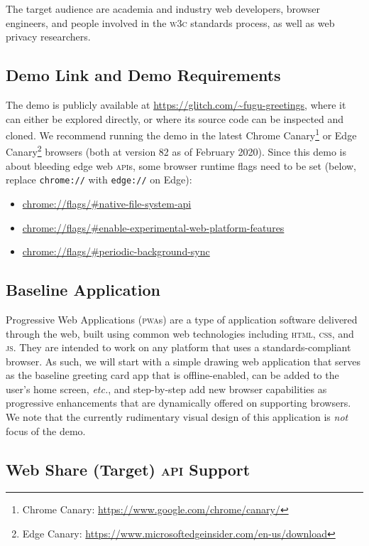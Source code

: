 \documentclass[sigconf]{acmart}
\begin{document}
The target audience are academia and industry web developers, browser engineers,
and people involved in the \textsc{w3c} standards process,
as well as web privacy researchers.

\subsection{Demo Link and Demo Requirements}

The demo is publicly available at \url{https://glitch.com/~fugu-greetings},
where it can either be explored directly,
or where its source code can be inspected and cloned.
We recommend running the demo in the latest Chrome
Canary\footnote{Chrome Canary: \url{https://www.google.com/chrome/canary/}}
or Edge
Canary\footnote{Edge Canary: \url{https://www.microsoftedgeinsider.com/en-us/download}}
browsers (both at version 82 as of February 2020).
Since this demo is about bleeding edge web \textsc{api}s,
some browser runtime flags need to be set (below, replace \texttt{chrome://}
with \texttt{edge://} on Edge):

\begin{itemize}
  \item \url{chrome://flags/#native-file-system-api}
  \item \url{chrome://flags/#enable-experimental-web-platform-features}  
  \item \url{chrome://flags/#periodic-background-sync}
\end{itemize}

\subsection{Baseline Application}

Progressive Web Applications (\textsc{pwa}s) are a type of application software
delivered through the web, built using common web technologies
including \textsc{html}, \textsc{css}, and \textsc{js}.
They are intended to work on any platform that uses a standards-compliant browser.
As such, we will start with a simple drawing web application
that serves as the baseline greeting card app that is offline-enabled,
can be added to the user's home screen, \textit{etc.},
and step-by-step add new browser capabilities
as progressive enhancements that are dynamically offered on supporting browsers.
We note that the currently rudimentary visual design of this application is \textit{not} focus of the demo.

\subsection{Web Share (Target) \textsc{api} Support}
\end{document}
